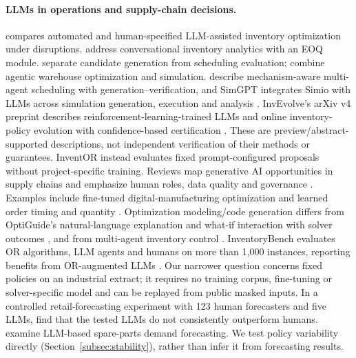 \documentclass[preprint,12pt,nonatbib]{elsarticle}
\let\cite\parencite
\begin{document}
\paragraph{LLMs in operations and supply-chain decisions.}
\textcite{wu2026disruptions} compares automated and human-specified LLM-assisted inventory optimization under disruptions. \textcite{zabraoui2026conversational} address conversational inventory analytics with an EOQ module. \textcite{wang2025evolutionary} separate candidate generation from scheduling evaluation; \textcite{elbaz2026warehouse} combine agentic warehouse optimization and simulation. \textcite{yan2026mechanism} describe mechanism-aware multi-agent scheduling with generation--verification, and SimGPT integrates Simio with LLMs across simulation generation, execution and analysis \cite{dehghani2026simgpt}. InvEvolve's arXiv v4 preprint describes reinforcement-learning-trained LLMs and online inventory-policy evolution with confidence-based certification \cite{huang2026invevolve}. These are preview/abstract-supported descriptions, not independent verification of their methods or guarantees. InventOR instead evaluates fixed prompt-configured proposals without project-specific training.
Reviews map generative AI opportunities in supply chains \cite{li2024genaiscm, song2026llmscm} and emphasize human roles, data quality and governance \cite{trifone2026agentic, cannas2023aiscm, venkatesh2023adoption}. Examples include fine-tuned digital-manufacturing optimization \cite{amarasinghe2026finetuned} and learned order timing and quantity \cite{liu2026transformer}. Optimization modeling/code generation \cite{huang2025orlm, ahmaditeshnizi2024optimus, zhang2025or} differs from OptiGuide's natural-language explanation and what-if interaction with solver outcomes \cite{li2023large}, and from multi-agent inventory control \cite{quan2024invagent, jannelli2025agentic}. InventoryBench evaluates OR algorithms, LLM agents and humans on more than 1,000 instances, reporting benefits from OR-augmented LLMs \cite{baek2026inventorybench}. Our narrower question concerns fixed policies on an industrial extract; it requires no training corpus, fine-tuning or solver-specific model and can be replayed from public masked inputs. In a controlled retail-forecasting experiment with 123 human forecasters and five LLMs, \textcite{abolghasemi2025humans} find that the tested LLMs do not consistently outperform humans. \textcite{nakhost2025copilot} examine LLM-based spare-parts demand forecasting. We test policy variability directly (Section~\ref{subsec:stability}), rather than infer it from forecasting results.
\end{document}
